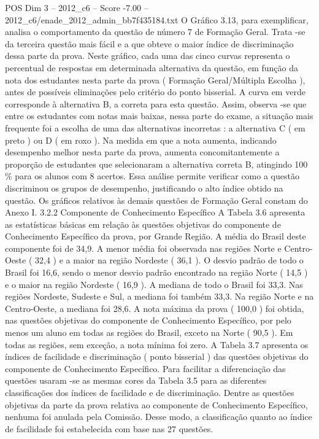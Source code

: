 \begin{textsample}{POS Dim 3 – 2012\_c6 – Score -7.00 – 2012\_c6/enade\_2012\_admin\_bb7f435184.txt}
O Gráfico 3.13, para exemplificar, analisa o comportamento da questão de número 7 de Formação Geral.
Trata -se da terceira questão mais fácil e a que obteve o maior índice de discriminação dessa parte da prova.
Neste gráfico, cada uma das cinco curvas representa o percentual de respostas em determinada alternativa da questão, em função da nota dos estudantes nesta parte da prova ( Formação Geral/Múltipla Escolha ), antes de possíveis eliminações pelo critério do ponto bisserial.
A curva em verde corresponde à alternativa B, a correta para esta questão.
Assim, observa -se que entre os estudantes com notas mais baixas, nessa parte do exame, a situação mais frequente foi a escolha de uma das alternativas incorretas : a alternativa C ( em preto ) ou D ( em roxo ).
Na medida em que a nota aumenta, indicando desempenho melhor nesta parte da prova, aumenta concomitantemente a proporção de estudantes que selecionaram a alternativa correta B, atingindo 100 \% para os alunos com 8 acertos.
Essa análise permite verificar como a questão discriminou os grupos de desempenho, justificando o alto índice obtido na questão.
Os gráficos relativos às demais questões de Formação Geral constam do Anexo I. 3.2.2 Componente de Conhecimento Específico A Tabela 3.6 apresenta as estatísticas básicas em relação às questões objetivas do componente de Conhecimento Específico da prova, por Grande Região.
A média do Brasil deste componente foi de 34,9.
A menor média foi observada nas regiões Norte e Centro-Oeste ( 32,4 ) e a maior na região Nordeste ( 36,1 ).
O desvio padrão de todo o Brasil foi 16,6, sendo o menor desvio padrão encontrado na região Norte ( 14,5 ) e o maior na região Nordeste ( 16,9 ).
A mediana de todo o Brasil foi 33,3.
Nas regiões Nordeste, Sudeste e Sul, a mediana foi também 33,3.
Na região Norte e na Centro-Oeste, a mediana foi 28,6.
A nota máxima da prova ( 100,0 ) foi obtida, nas questões objetivas do componente de Conhecimento Específico, por pelo menos um aluno em todas as regiões do Brasil, exceto na Norte ( 90,5 ).
Em todas as regiões, sem exceção, a nota mínima foi zero.
A Tabela 3.7 apresenta os índices de facilidade e discriminação ( ponto bisserial ) das questões objetivas do componente de Conhecimento Específico.
Para facilitar a diferenciação das questões usaram -se as mesmas cores da Tabela 3.5 para as diferentes classificações dos índices de facilidade e de discriminação.
Dentre as questões objetivas da parte da prova relativa ao componente de Conhecimento Específico, nenhuma foi anulada pela Comissão.
Desse modo, a classificação quanto ao índice de facilidade foi estabelecida com base nas 27 questões.

\end{textsample}
